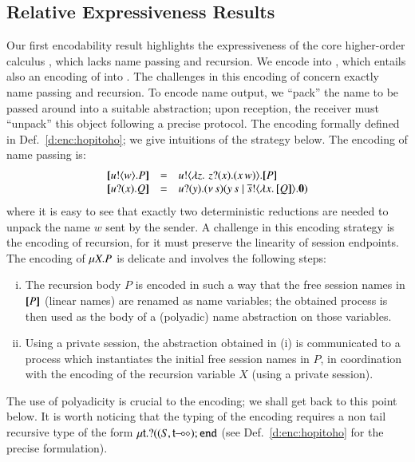 \subsection{Relative Expressiveness Results}
\label{subsec:intro:expr}
Our first encodability result highlights the expressiveness of 
the core higher-order calculus \HO, which lacks name passing and recursion. 
We encode \HOp into \HO, which entails also an encoding of \sessp into \HO.
The challenges in this encoding of concern exactly name passing and recursion.
To encode name output, we ``pack''
the name to be passed around into a suitable abstraction; 
upon reception, the receiver must ``unpack'' this object following a precise protocol.
The encoding formally defined in Def.~\ref{d:enc:hopitoho}; we give intuitions of the strategy below.
The encoding of name passing is:
\[
\begin{array}{rcll}
  \map{\bout{u}{w} P}	&=&	\bout{u}{ \abs{z}{\,\binp{z}{x} (\appl{x}{w})} } \map{P} \\
  \map{\binp{u}{x} Q}	&=&	\binp{u}{y} \newsp{s}{\appl{y}{s} \Par \bout{\dual{s}}{\abs{x}{\map{Q}}} \inact}
\end{array}
\]
where it is easy to see that 
exactly two deterministic reductions are needed
to unpack the name $w$ sent by the sender.
A challenge in this encoding strategy is the encoding of recursion, 
for it must preserve the linearity of session endpoints. 
The encoding of $\mu X. P$ is delicate and involves the following steps:
\begin{enumerate}[i)]
\item The recursion body $P$ is encoded in such a way that
the free session names in $[\!\![P]\!\!]$ (linear names) are renamed as name variables; the obtained process
is then used as the body of a (polyadic) name abstraction on those variables.
\item Using a private session, the abstraction obtained in (i) is communicated to a
process which instantiates the initial free session names in $P$, 
in coordination with the encoding of the recursion variable $X$ (using a private session).
\end{enumerate}
The use of polyadicity is crucial to the encoding; we shall get back to this point below.
It is worth noticing that the typing of the encoding requires 
a non tail recursive type of the form $\mu\mathsf{t}.? ((S,\mathsf{t}\!\! \multimap\!\! \diamond) ; \mathtt{end}$
(see Def.~\ref{d:enc:hopitoho} for the precise formulation).

